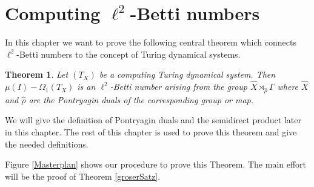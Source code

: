 \documentclass[12pt,a4paper]{scrartcl}
\theoremstyle{plain}
\newtheorem{Theorem}{Theorem}[section]
\theoremstyle{definition}
\numberwithin{equation}{section}
\newcommand{\2}{\mathbb{Z} / 2 \mathbb{Z}}
\newcommand{\1}{\bar{1}}
\newcommand{\0}{\bar{0}}
\begin{document}
\section{Computing $\ell^2$-Betti numbers}
In this chapter we want to prove the following central theorem which connects $\ell^2$-Betti numbers to the concept of Turing dynamical systems.
\begin{Theorem} \label{HS}
	Let $(T_X)$ be a computing Turing dynamical system. Then $\mu (I) - \Omega_1(T_X)$ is an $\ell^2$-Betti number arising from the group $\hat{X} \rtimes_{\hat{\rho}} \Gamma$ where $\hat{X}$ and $\hat{\rho}$ are the Pontryagin duals of the corresponding group or map.
\end{Theorem}
We will give the definition of Pontryagin duals and the semidirect product later in this chapter. The rest of this chapter is used to prove this theorem and give the needed definitions.

Figure \ref{Masterplan} shows our procedure to prove this Theorem. The main effort will be the proof of Theorem \ref{groserSatz}.
\end{document}
